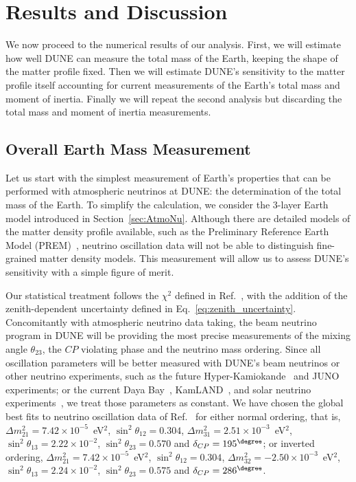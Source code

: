 \section{Results and Discussion}\label{sec:ResultsDiscussion}
We now proceed to the numerical results of our analysis.
First, we will estimate how well DUNE can measure the total mass of the Earth, keeping the shape of the matter profile fixed.
Then we will estimate DUNE's sensitivity to the matter profile itself accounting for current measurements of the Earth's total mass and moment of inertia.
Finally we will repeat the second analysis but discarding the total mass and moment of inertia measurements.

\subsection{Overall Earth Mass Measurement}
\label{subsec:MeasureMass}
Let us start with the simplest measurement of Earth's properties that can be performed with atmospheric neutrinos at DUNE: the determination of the total mass of the Earth.
To simplify the calculation, we consider the 3-layer Earth model introduced in Section~\ref{sec:AtmoNu}.
Although there are detailed models of the matter density profile available, such as the Preliminary Reference Earth Model (PREM)~\cite{Dziewonski:1981xy}, neutrino oscillation data will not be able to distinguish fine-grained matter density models.
This measurement will allow us to assess DUNE's sensitivity with a simple figure of merit.

Our statistical treatment follows the $\chi^2$ defined in Ref.~\cite{Kelly:2019itm}, with the addition of the zenith-dependent uncertainty defined in Eq.~\eqref{eq:zenith_uncertainty}.
Concomitantly with atmospheric neutrino data taking, the beam neutrino program in DUNE will be providing the most precise measurements of the mixing angle $\theta_{23}$, the $CP$ violating phase and the neutrino mass ordering.
Since all oscillation parameters will be better measured with DUNE's beam neutrinos or other neutrino experiments, such as the future Hyper-Kamiokande~\cite{Hyper-Kamiokande:2018ofw} and JUNO~\cite{JUNO:2015sjr} experiments; or the current Daya Bay~\cite{DayaBay:2018yms}, KamLAND~\cite{KamLAND:2013rgu}, and solar neutrino experiments~\cite{Aharmim:2011vm, Borexino:2013zhu, Super-Kamiokande:2016yck}, we treat those parameters as constant.
We have chosen the global best fits  to neutrino oscillation data of Ref.~\cite{Esteban:2020cvm} for either normal ordering, that is, $\Delta m^2_{21}=7.42\times10^{-5}$~eV$^2$, $\sin^2\theta_{12}=0.304$, $\Delta m^2_{31}=2.51\times10^{-3}$~eV$^2$, $\sin^2\theta_{13}=2.22 \times 10^{-2}$, $\sin^2\theta_{23}=0.570$ and $\delta_{CP}=195^\degree$; or inverted ordering, $\Delta m^2_{21}=7.42\times10^{-5}$~eV$^2$, $\sin^2\theta_{12}=0.304$, $\Delta m^2_{32}=-2.50\times10^{-3}$~eV$^2$, $\sin^2\theta_{13}=2.24 \times 10^{-2}$, $\sin^2\theta_{23}=0.575$ and $\delta_{CP}=286^\degree$.

